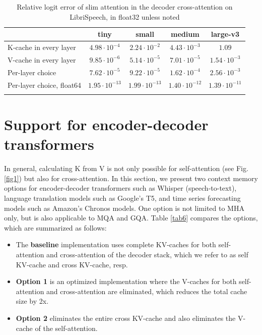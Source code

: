 \documentclass{article}
\def\fline{\Xhline{2\arrayrulewidth}}              %
\begin{document}
\begin{table}[t] \centering
  \caption{Relative logit error of slim attention in the decoder cross-attention on LibriSpeech, in float32 unless noted}
  \begin{tabular}{lcccc} \fline
                               & tiny                 & small                & medium               & large-v3             \\ \hline
  K-cache in every layer       & $4.98 \cdot 10^{-4}$  & $2.24 \cdot 10^{-2}$  & $4.43 \cdot 10^{-3}$  & $1.09$                \\
  V-cache in every layer       & $9.85 \cdot 10^{-6}$  & $5.14 \cdot 10^{-5}$  & $7.01 \cdot 10^{-5}$  & $1.54 \cdot 10^{-3}$  \\
  Per-layer choice             & $7.62 \cdot 10^{-5}$  & $9.22 \cdot 10^{-5}$  & $1.62 \cdot 10^{-4}$  & $2.56 \cdot 10^{-3}$  \\
  Per-layer choice, float64    & $1.95 \cdot 10^{-13}$ & $1.99 \cdot 10^{-13}$ & $1.40 \cdot 10^{-12}$ & $1.39 \cdot 10^{-11}$ \\ \fline
\end{tabular} \label{tab:logits} \end{table}

\section{Support for encoder-decoder transformers} \label{sec:enc-dec}
In general, calculating K from V is not only possible for self-attention (see Fig. \ref{fig1}) but also for cross-attention. In this section, we present two context memory options for encoder-decoder transformers such as Whisper (speech-to-text), language translation models such as Google’s T5, and time series forecasting models such as Amazon’s Chronos models. One option is not limited to MHA only, but is also applicable to MQA and GQA. Table \ref{tab6} compares the options, which are summarized as follows:
\begin{itemize}[topsep=-1pt]
  \item The \textbf{baseline} implementation uses complete KV-caches for both self-attention and cross-attention of the decoder stack, which we refer to as self KV-cache and cross KV-cache, resp.
  \item \textbf{Option 1} is an optimized implementation where the V-caches for both self-attention and cross-attention are eliminated, which reduces the total cache size by 2x.
  \item \textbf{Option 2} eliminates the entire cross KV-cache and also eliminates the V-cache of the self-attention.
\end{itemize}
\end{document}
